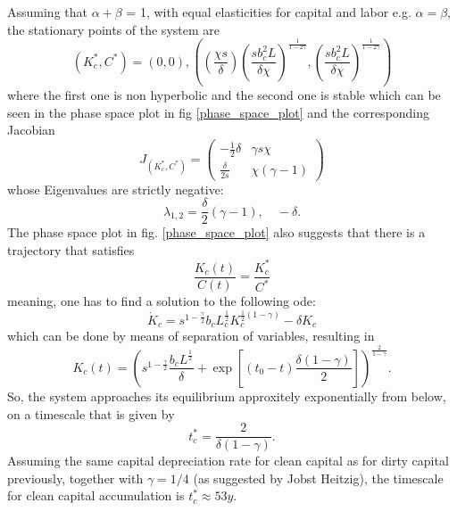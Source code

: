 Assuming that $\alpha + \beta$ = 1, with equal elasticities for capital and labor e.g. $\alpha = \beta$, the stationary points of the system are 
\begin{equation}
  (K_c^*, C^*) = (0,0), \left( \left( \frac{\chi s}{\delta} \right) \left( \frac{s b_c^2 L}{\delta \chi} \right)^{\frac{1}{1-2\gamma}}, \left( \frac{s b_c^2 L}{\delta \chi} \right)^{\frac{1}{1-2 \gamma}}  \right)
	\label{stationary_points}
\end{equation}
where the first one is non hyperbolic and the second one is stable which can be seen in the phase space plot in fig \ref{phase_space_plot} and the corresponding Jacobian
\begin{equation}
	J_{(K_c^*,C^*)} = 
		\begin{pmatrix}
			-\frac{1}{2}\delta & \gamma s \chi \\
			\frac{\delta}{2 s} & \chi \left(\gamma-1 \right)
		\end{pmatrix}
	\label{eq:learning_jacobian}
\end{equation}
whose Eigenvalues are strictly negative:
\begin{equation}
  \lambda_{1,2} = \frac{\delta}{2}(\gamma-1), \quad -\delta.
	\label{eq:learning_eigenvalues}
\end{equation}
The phase space plot in fig. \ref{phase_space_plot} also suggests that there is a trajectory that satisfies 
\begin{equation}
	\frac{K_c(t)}{C(t)} = \frac{K^*_c}{C^*}
\end{equation}
meaning, one has to find a solution to the following ode:
\begin{equation}
	\dot{K}_c = s^{1-\frac{\gamma}{2}} b_c L_c^{\frac{1}{2}}K_c^{\frac{1}{2}(1-\gamma)} - \delta K_c
	\label{eq:learning_trajectory_ode}
\end{equation}
which can be done by means of separation of variables, resulting in
\begin{equation}
  K_c(t) = \left( s^{1-\frac{\gamma}{2}}\frac{b_c L^{\frac{1}{2}}}{\delta} + \exp\left[ (t_0-t) \frac{\delta (1-\gamma)}{2} \right] \right)^{\frac{2}{1-\gamma}}.
	\label{eq:learning_trajectory_solution}
\end{equation}
So, the system approaches its equilibrium approxitely exponentially from below, on a timescale that is given by
\begin{equation}
	t_c^* = \frac{2}{\delta(1-\gamma)}
	\label{eq_learning_equilibrium_timescale}.
\end{equation}
Assuming the same capital depreciation rate for clean capital as for dirty capital previously, together with $\gamma = 1/4$ (as suggested by Jobst Heitzig), the timescale for clean capital accumulation is $t^*_c \approx 53 y$.

